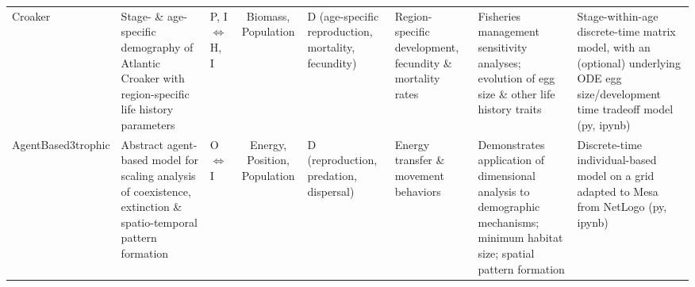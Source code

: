 \documentclass[10pt,legalpaper]{article}
\begin{document}
\begin{sidewaystable}
\begin{tabular}{|l|L|I|S|I|I|I|I|}
		Croaker & Stage- \& age-specific demography of Atlantic Croaker with region-specific life history parameters & P, I $\Leftrightarrow$ H, I & Biomass, Population & D (age-specific reproduction, mortality, fecundity) & Region-specific development, fecundity \& mortality rates & Fisheries management sensitivity analyses; evolution of egg size \& other life history traits & Stage-within-age discrete-time matrix model, with an (optional) underlying ODE egg size/development time tradeoff model (py, ipynb) \\
		
		AgentBased3trophic & Abstract agent-based model for scaling analysis of coexistence, extinction \& spatio-temporal pattern formation  & O $\Leftrightarrow$ I & Energy, Position, Population & D (reproduction, predation, dispersal) & Energy transfer \& movement behaviors & Demonstrates application of dimensional analysis to demographic mechanisms; minimum habitat size; spatial pattern formation & Discrete-time individual-based model on a grid adapted to Mesa from NetLogo (py, ipynb) \\
		\hline
	\end{tabular}
\end{sidewaystable}
\end{document}

